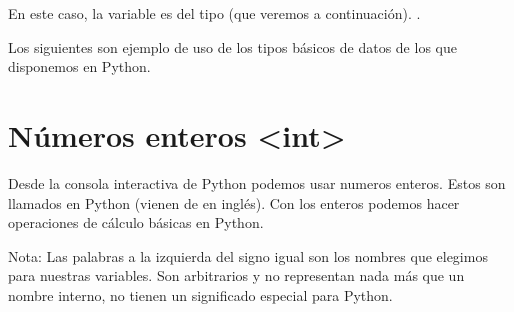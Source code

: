 \documentclass[a5paper,9pt,spanish]{sphinxmanual}
\begin{document}
\sphinxAtStartPar
En este caso, la variable  es del tipo  (que veremos a continuación).
.

\sphinxAtStartPar
Los siguientes son ejemplo de uso de los tipos básicos de datos de los que
disponemos en Python.

\sphinxstepscope


\chapter{Números enteros \textless{}int\textgreater{}}
\label{\detokenize{int:numeros-enteros-int}}\label{\detokenize{int::doc}}
\sphinxAtStartPar
Desde la consola interactiva de Python podemos usar numeros enteros.
Estos son llamados  en Python (vienen de  en inglés).
Con los enteros podemos hacer operaciones de cálculo básicas en Python.

\begin{sphinxVerbatim}[commandchars=\\\{\}]
  
      

    
      
    

      
\end{sphinxVerbatim}

\sphinxAtStartPar
Nota: Las palabras a la izquierda del signo igual son los nombres que elegimos
para nuestras variables. Son arbitrarios y no representan nada más que un nombre
interno, no tienen un significado especial para Python.
\end{document}
